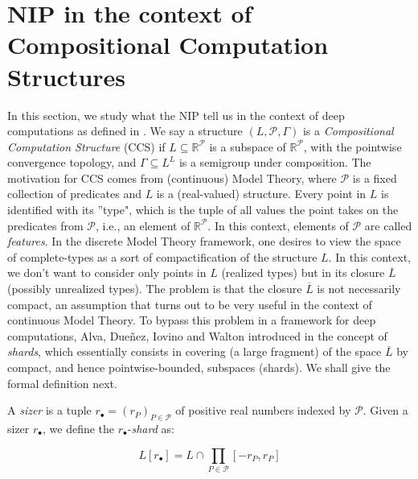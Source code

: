 \documentclass[psamsfonts]{amsart}
\theoremstyle{definition}
\theoremstyle{remark}
\numberwithin{equation}{section}
\begin{document}
\section{NIP in the context of Compositional Computation Structures}

In this section, we study what the NIP tell us in the context of deep computations as defined in \cite{alva2024approximability}. We say a structure $(L,\mathcal P,\Gamma)$ is a \emph{Compositional Computation Structure} (CCS) if $L\subseteq\mathbb R^\mathcal P$ is a subspace of $\mathbb{R}^\mathcal{P}$, with the pointwise convergence topology, and $\Gamma\subseteq L^L$ is a semigroup under composition. The motivation for CCS comes from (continuous) Model Theory, where $\mathcal{P}$ is a fixed collection of predicates and $L$ is a (real-valued) structure. Every point in $L$ is identified with its ''type", which is the tuple of all values the point takes on the predicates from $\mathcal{P}$, i.e., an element of $\mathbb{R}^\mathcal{P}$. In this context, elements of $\mathcal{P}$ are called \emph{features}. In the discrete Model Theory framework, one desires to view the space of complete-types as a sort of compactification of the structure $L$. In this context, we don't want to consider only points in $L$ (realized types) but in its closure $\overline{L}$ (possibly unrealized types). The problem is that the closure $\overline{L}$ is not necessarily compact, an assumption that turns out to be very useful in the context of continuous Model Theory. To bypass this problem in a framework for deep computations, Alva, Dueñez, Iovino and Walton introduced in \cite{alva2024approximability} the concept of \emph{shards}, which essentially consists in covering (a large fragment) of the space $\overline{L}$ by compact, and hence pointwise-bounded, subspaces (shards). We shall give the formal definition next.

A \emph{sizer} is a tuple $r_{\bullet}=(r_P)_{P\in\mathcal{P}}$ of positive real numbers indexed by $\mathcal{P}$. Given a sizer $r_\bullet$, we define the $r_\bullet$-\emph{shard} as:

$$L[r_\bullet]=L\cap\prod_{P\in\mathcal{P}}[-r_P,r_P]$$
\end{document}

